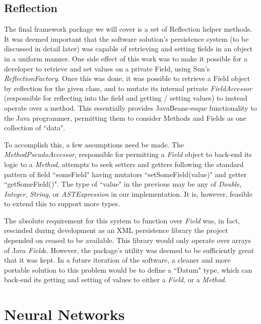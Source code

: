 \documentclass{acm_proc_article-sp}
\begin{document}
\subsection{Reflection}
{
The final framework package we will cover is a set of Reflection helper methods. It was deemed important that the software solution's persistence system (to be discussed in detail later) was capable of retrieving and setting fields in an object in a uniform manner. One side effect of this work was to make it possible for a developer to retrieve and set values on a private Field, using Sun's {\textit{ReflectionFactory}}. Once this was done, it was possible to retrieve a Field object by reflection for the given class, and to mutate its internal private {\textit{FieldAccessor}} (responsible for reflecting into the field and getting / setting values) to instead operate over a method. This essentially provides JavaBeans{}-esque functionality to the Java programmer, permitting them to consider Methods and Fields as one collection of ``data".

To accomplish this, a few assumptions need be made. The {\textit{MethodPseudoAccessor}}, responsible for permitting a {\textit{Field}} object to back{}-end its logic to a {\textit{Method}}, attempts to seek setters and getters following the standard pattern of field ``someField" having mutators ``setSomeField(value)" and getter ``getSomeField()". The type of ``value" in the previous may be any of {\textit{Double}}, {\textit{Integer}}, {\textit{String}}, or {\textit{ASTExpression}} in our implementation. It is, however, feasible to extend this to support more types.

The absolute requirement for this system to function over {\textit{Field}} was, in fact, rescinded during development as an XML persistence library the project depended on ceased to be available. This library would only operate over arrays of Java {\textit{Field}}s. However, the package's utility was deemed to be sufficiently great that it was kept. In a future iteration of the software, a cleaner and more portable solution to this problem would be to define a ``Datum" type, which can back{}-end its getting and setting of values to either a {\textit{Field}}, or a {\textit{Method}}.
}

\section{Neural Networks}
\end{document}
